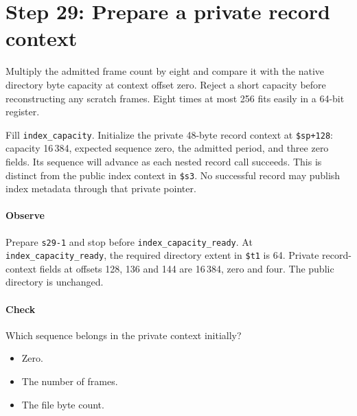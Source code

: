 \section{Step 29: Prepare a private record context}
Multiply the admitted frame count by eight and compare it with the native
directory byte capacity at context offset zero. Reject a short capacity before
reconstructing any scratch frames. Eight times at most 256 fits easily in a
64-bit register.

Fill \texttt{index\_capacity}. Initialize the private 48-byte record context
at \texttt{\$sp+128}: capacity 16\,384, expected sequence zero, the admitted
period, and three zero fields. Its sequence will advance as each nested record
call succeeds. This is distinct from the public index context in
\texttt{\$s3}. No successful record may publish index metadata through that
private pointer.

\paragraph{Observe} Prepare \texttt{s29-1} and stop before
\texttt{index\_capacity\_ready}. At \texttt{index\_capacity\_ready}, the required directory
extent in \texttt{\$t1} is 64. Private record-context fields at offsets 128,
136 and 144 are 16\,384, zero and four. The public directory is unchanged.

\paragraph{Check} Which sequence belongs in the private context initially?
\begin{itemize}
\item[A.] Zero.
\item[B.] The number of frames.
\item[C.] The file byte count.
\end{itemize}
